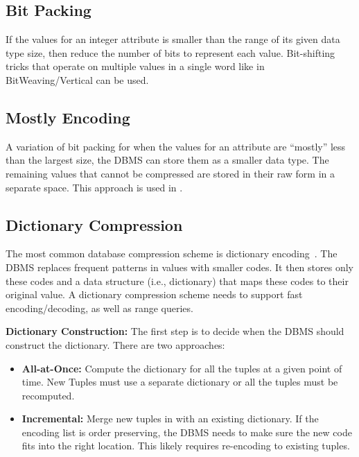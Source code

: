 \documentclass[11pt]{article}
\begin{document}
\subsection*{Bit Packing}
If the values for an integer attribute is smaller than the range of its given data type size, then reduce the number of bits to represent each value. Bit-shifting tricks that operate on multiple values in a single word like in BitWeaving/Vertical can be used.

\subsection*{Mostly Encoding}
A variation of bit packing for when the values for an attribute are ``mostly'' less than the largest size, the DBMS can store
them as a smaller data type. The remaining values that cannot be compressed are stored in their raw
form in a separate space. This approach is used in .

\subsection*{Dictionary Compression}
The most common database compression scheme is dictionary encoding~\cite{p283-binnig}. The DBMS
replaces frequent patterns in values with smaller codes. It then stores only these codes and a data
structure (i.e., dictionary) that maps these codes to their original value. A dictionary compression
scheme needs to support fast encoding/decoding, as well as range queries.

\textbf{Dictionary Construction:} The first step is to decide when the DBMS should construct the dictionary. There are two approaches:
\begin{itemize}
    \item \textbf{All-at-Once:}
    Compute the dictionary for all the tuples at a given point of time.
    New Tuples must use a separate dictionary or all the tuples must be recomputed.

    \item \textbf{Incremental:}
    Merge new tuples in with an existing dictionary. If the encoding list is order
    preserving, the DBMS needs to make sure the new code fits into the right location. This likely
    requires re-encoding to existing tuples.
\end{itemize}
\end{document}
